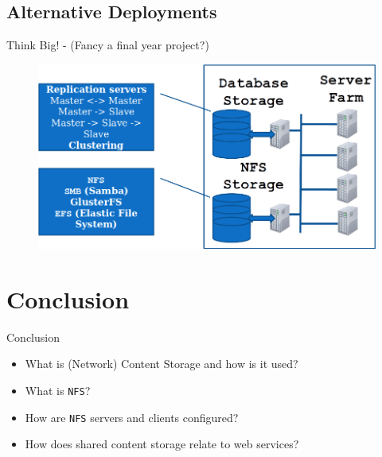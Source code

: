 \documentclass[xcolor=table,aspectratio=169]{beamer}
\begin{document}
\subsection{Alternative Deployments}
\begin{frame}{Think Big! - \small{(Fancy a final year project?)}}
  \begin{figure}
    \begin{center}
      \includegraphics[width=0.7\linewidth]{Scalability.png}
    \end{center}
  \end{figure}
\end{frame}

\section*{Conclusion}
\begin{frame}{Conclusion}
  \begin{itemize}
    \item What is (Network) Content Storage and how is it used?
    \item What is \texttt{NFS}?
    \item How are \texttt{NFS} servers and clients configured?
    \item How does shared content storage relate to web services?
  \end{itemize}
\end{frame}
\end{document}
